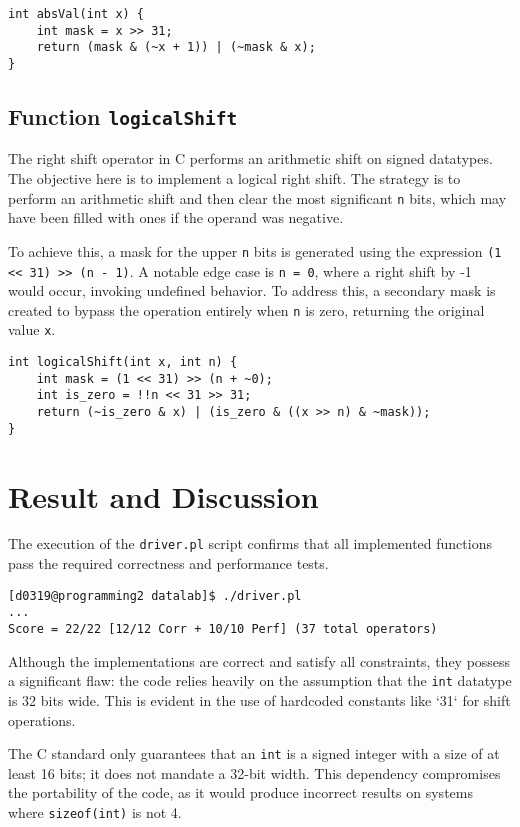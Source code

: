 \documentclass{article}
\begin{document}
\begin{verbatim}
int absVal(int x) {
    int mask = x >> 31;
    return (mask & (~x + 1)) | (~mask & x);
}
\end{verbatim}

\subsection{Function \texttt{logicalShift}}

The right shift operator in C performs an arithmetic shift on signed datatypes.
The objective here is to implement a logical right shift. The strategy is to
perform an arithmetic shift and then clear the most significant \verb|n| bits, 
which may have been filled with ones if the operand was negative.

To achieve this, a mask for the upper \verb|n| bits is generated using the 
expression \verb|(1 << 31) >> (n - 1)|. A notable edge case is \verb|n = 0|, 
where a right shift by -1 would occur, invoking undefined behavior. To address 
this, a secondary mask is created to bypass the operation entirely when \verb|n| 
is zero, returning the original value \verb|x|.

\begin{verbatim}
int logicalShift(int x, int n) {
    int mask = (1 << 31) >> (n + ~0);
    int is_zero = !!n << 31 >> 31;
    return (~is_zero & x) | (is_zero & ((x >> n) & ~mask));
}
\end{verbatim}

\section{Result and Discussion}

The execution of the \verb|driver.pl| script confirms that all implemented
functions pass the required correctness and performance tests.

\begin{verbatim}
[d0319@programming2 datalab]$ ./driver.pl
...
Score = 22/22 [12/12 Corr + 10/10 Perf] (37 total operators)
\end{verbatim}

Although the implementations are correct and satisfy all constraints, they
possess a significant flaw: the code relies heavily on the assumption that the
\verb|int| datatype is 32 bits wide. This is evident in the use of hardcoded
constants like `31` for shift operations.

The C standard only guarantees that an \verb|int| is a signed integer with a
size of at least 16 bits; it does not mandate a 32-bit width. This dependency
compromises the portability of the code, as it would produce incorrect results
on systems where \verb|sizeof(int)| is not 4.
\end{document}
